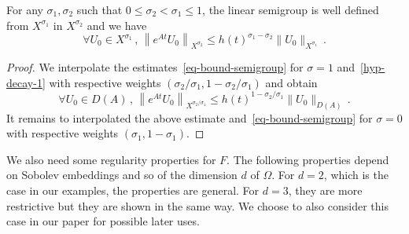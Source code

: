 \begin{prop}\label{prop-decay-interpole}
For any $\sigma_1,\sigma_2$ such that $0\leq \sigma_2<\sigma_1 \leq 1$, the linear semigroup is well defined from $X^{\sigma_1}$ in $X^{\sigma_2}$ and we have
\[
\forall U_0\in X^{\sigma_1}\,,\,\left\|e^{At}U_0\right\|_{X^{\sigma_2}} \leq
h(t)^{\sigma_1-\sigma_2} \|U_0\|_{X^{\sigma_1}}\,.
\]
\end{prop}
\begin{proof}
We interpolate the estimates~\eqref{eq-bound-semigroup} for $\sigma=1$ and~\eqref{hyp-decay-1} with respective weights $(\sigma_2/\sigma_1,1-\sigma_2/\sigma_1)$ and obtain
\[
\forall U_0\in D(A)\,,\,\left\|e^{At}U_0\right\|_{X^{\sigma_2/\sigma_1}} \leq
h(t)^{1-\sigma_2/\sigma_1}\|U_0\|_{D(A)}\,.
\]
It remains to interpolated the above estimate and~\eqref{eq-bound-semigroup} for $\sigma=0$ with respective weights $(\sigma_1,1-\sigma_1)$.
\end{proof}



We also need some regularity properties for $F$. The following properties depend on Sobolev embeddings and so of the dimension $d$ of $\Omega$. For $d=2$, which is the case in our examples, the properties are general. For $d=3$, they are more restrictive but they are shown in the same way. We choose to also consider this case in our paper for possible later uses.

